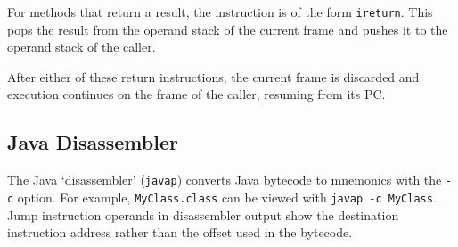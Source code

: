 For methods that return a result, the instruction is of the form \texttt{ireturn}.
This pops the result from the operand stack of the current frame and pushes it to the operand stack of the caller.

After either of these return instructions, the current frame is discarded and execution continues on the frame of the caller, resuming from its PC.

\subsection{Java Disassembler}

The Java `disassembler' (\texttt{javap}) converts Java bytecode to mnemonics with the \texttt{-c} option.
For example, \texttt{MyClass.class} can be viewed with \texttt{javap -c MyClass}.
Jump instruction operands in disassembler output show the destination instruction address rather than the offset used in the bytecode.
